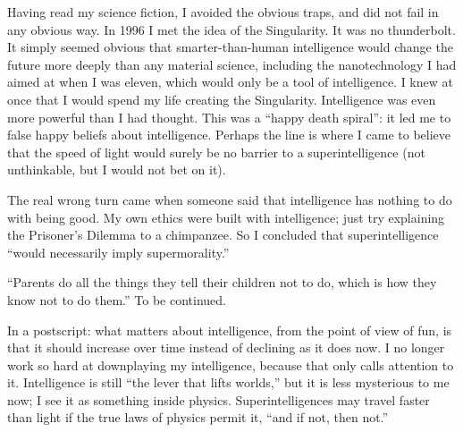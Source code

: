 Having read my science fiction, I avoided the obvious traps, and did not fail in any obvious way. In 1996 I met the idea of the Singularity. It was no thunderbolt. It simply seemed obvious that smarter-than-human intelligence would change the future more deeply than any material science, including the nanotechnology I had aimed at when I was eleven, which would only be a tool of intelligence. I knew at once that I would spend my life creating the Singularity. Intelligence was even more powerful than I had thought. This was a ``happy death spiral'': it led me to false happy beliefs about intelligence. Perhaps the line is where I came to believe that the speed of light would surely be no barrier to a superintelligence (not unthinkable, but I would not bet on it). 

The real wrong turn came when someone said that intelligence has nothing to do with being good. My own ethics were built with intelligence; just try explaining the Prisoner's Dilemma to a chimpanzee. So I concluded that superintelligence ``would necessarily imply supermorality.'' 

``Parents do all the things they tell their children not to do, which is how they know not to do them.'' To be continued.

In a postscript: what matters about intelligence, from the point of view of fun, is that it should increase over time instead of declining as it does now. I no longer work so hard at downplaying my intelligence, because that only calls attention to it. Intelligence is still ``the lever that lifts worlds,'' but it is less mysterious to me now; I see it as something inside physics. Superintelligences may travel faster than light if the true laws of physics permit it, ``and if not, then not.''

